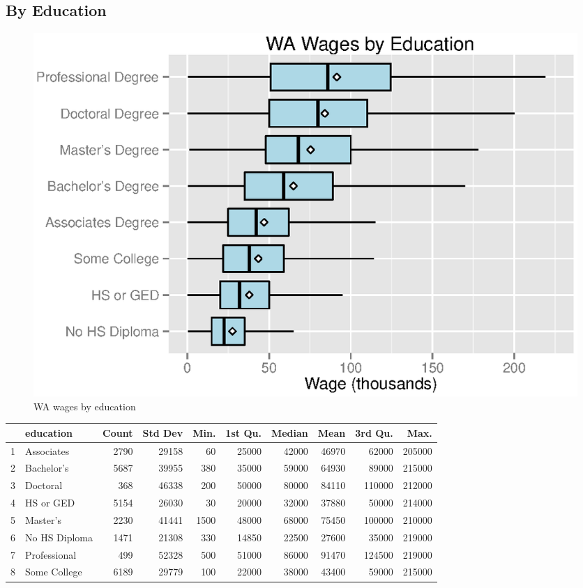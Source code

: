 \documentclass{exam}
\begin{document}
  \subsection{By Education}
  \begin{figure}[H]
    \centering
    \includegraphics{figures/wa_wage_by_education.eps}
    \caption{WA wages by education}
  \end{figure}

  \begin{table}[ht]
    \centering
    \begin{tabular}{rlrrrrrrrr}
      \toprule
        & education     & Count & Std Dev & Min. & 1st Qu. & Median & Mean  & 3rd Qu. & Max. \\
      \midrule
      1 & Associates    & 2790  & 29158   & 60   & 25000   & 42000  & 46970 & 62000   & 205000 \\
      2 & Bachelor's    & 5687  & 39955   & 380  & 35000   & 59000  & 64930 & 89000   & 215000 \\
      3 & Doctoral      & 368   & 46338   & 200  & 50000   & 80000  & 84110 & 110000  & 212000 \\
      4 & HS or GED     & 5154  & 26030   & 30   & 20000   & 32000  & 37880 & 50000   & 214000 \\
      5 & Master's      & 2230  & 41441   & 1500 & 48000   & 68000  & 75450 & 100000  & 210000 \\
      6 & No HS Diploma & 1471  & 21308   & 330  & 14850   & 22500  & 27600 & 35000   & 219000 \\
      7 & Professional  & 499   & 52328   & 500  & 51000   & 86000  & 91470 & 124500  & 219000 \\
      8 & Some College  & 6189  & 29779   & 100  & 22000   & 38000  & 43400 & 59000   & 215000 \\
      \midrule
    \end{tabular}
  \end{table}
\end{document}
